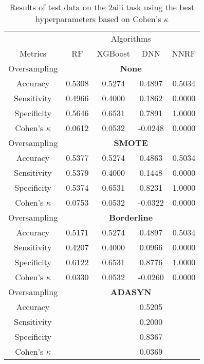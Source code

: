 \begin{table}[!htb]
\centering
\caption{Results of test data on the 2aiii task using the best hyperparameters based on Cohen's $\kappa$}
\label{tab:kfold_results}
\begin{tabular}{c | c c c c}
\hline
 & \multicolumn{4}{c}{Algorithms}\\ 
Metrics &RF & XGBoost & DNN & NNRF\\ 
\hline
Oversampling &\multicolumn{4}{|c}{\textbf{None}}\\ 
\hline
Accuracy & 0.5308 & 0.5274 & 0.4897 & 0.5034\\ 
Sensitivity & 0.4966 & 0.4000 & 0.1862 & 0.0000\\ 
Specificity & 0.5646 & 0.6531 & 0.7891 & 1.0000\\ 
Cohen's $\kappa$ & 0.0612 & 0.0532 & -0.0248 & 0.0000\\ 
\hline
Oversampling &\multicolumn{4}{|c}{\textbf{SMOTE}}\\ 
\hline
Accuracy & 0.5377 & 0.5274 & 0.4863 & 0.5034\\ 
Sensitivity & 0.5379 & 0.4000 & 0.1448 & 0.0000\\ 
Specificity & 0.5374 & 0.6531 & 0.8231 & 1.0000\\ 
Cohen's $\kappa$ & 0.0753 & 0.0532 & -0.0322 & 0.0000\\ 
\hline
Oversampling &\multicolumn{4}{|c}{\textbf{Borderline}}\\ 
\hline
Accuracy & 0.5171 & 0.5274 & 0.4897 & 0.5034\\ 
Sensitivity & 0.4207 & 0.4000 & 0.0966 & 0.0000\\ 
Specificity & 0.6122 & 0.6531 & 0.8776 & 1.0000\\ 
Cohen's $\kappa$ & 0.0330 & 0.0532 & -0.0260 & 0.0000\\ 
\hline
Oversampling &\multicolumn{4}{|c}{\textbf{ADASYN}}\\ 
\hline
Accuracy &  &  & 0.5205 & \\ 
Sensitivity &  &  & 0.2000 & \\ 
Specificity &  &  & 0.8367 & \\ 
Cohen's $\kappa$ &  &  & 0.0369 & \\ 
\hline
\end{tabular}
\end{table}

